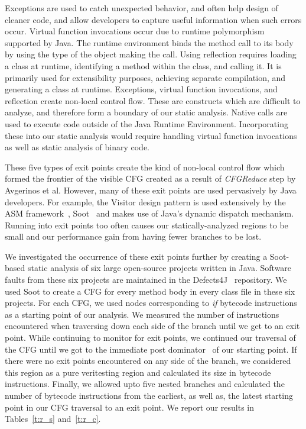 %
Exceptions are used to catch unexpected behavior, and often help design of cleaner code, and allow developers to capture useful information when such errors occur.
%
Virtual function invocations occur due to runtime polymorphism supported by Java.
%
The runtime environment binds the method call to its body by using the type of the object making the call.
%
Using reflection requires loading a class at runtime, identifying a method within the class, and calling it.
%
It is primarily used for extensibility purposes, achieving separate compilation, and generating a class at runtime.
%
Exceptions, virtual function invocations, and reflection create non-local control flow.
%
These are constructs which are difficult to analyze, and therefore form a boundary of our static analysis.
%
Native calls are used to execute code outside of the Java Runtime Environment.
%
Incorporating these into our static analysis would require handling virtual function invocations as well as static analysis of binary code.

These five types of exit points create the kind of non-local control flow which formed the frontier of the visible CFG created as a result of \textit{CFGReduce} step by Avgerinos et al.%
However, many of these exit points are used pervasively by Java developers.
%
For example, the Visitor design pattern is used extensively by the ASM framework~\cite{asm}, Soot~\cite{soot} and makes use of Java\rq s dynamic dispatch mechanism.
%
Running into exit points too often causes our statically-analyzed regions to be small and our performance gain from having fewer branches to be lost.

We investigated the occurrence of these exit points further by creating a Soot-based static analysis of six large open-source projects written in Java.
%
Software faults from these six projects are maintained in the Defects4J~\cite{defects4j} repository.
%
We used Soot to create a CFG for every method body in every class file in these six projects.
%
For each CFG, we used nodes corresponding to \textit{if} bytecode instructions as a starting point of our analysis.
%
We measured the number of instructions encountered when traversing down each side of the branch until we get to an exit point.
%
While continuing to monitor for exit points, we continued our traversal of the CFG until we got to the immediate post dominator~\cite{dragon-book} of our starting point.
%
If there were no exit points encountered on any side of the branch, we considered this region as a pure veritesting region and calculated its size in bytecode instructions.
%
Finally, we allowed upto five nested branches and calculated the number of bytecode instructions from the earliest, as well as, the latest starting point in our CFG traversal to an exit point.
%
We report our results in Tables~\ref{t:r_s} and~\ref{t:r_c}.

